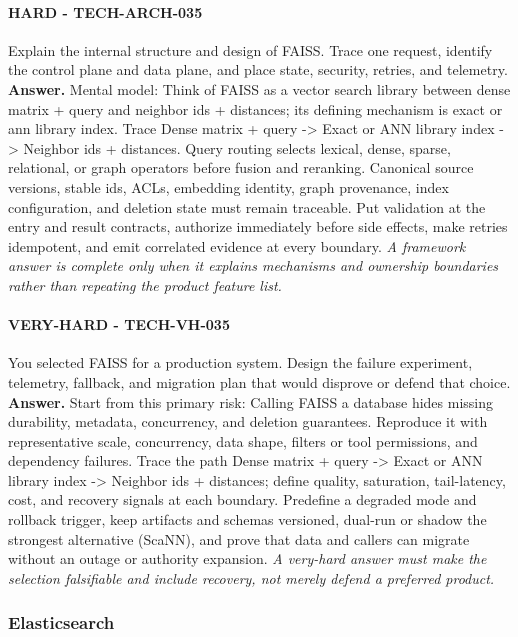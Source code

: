 \paragraph{HARD - TECH-ARCH-035} Explain the internal structure and design of FAISS. Trace one request, identify the control plane and data plane, and place state, security, retries, and telemetry.
\textbf{Answer.} Mental model: Think of FAISS as a vector search library between dense matrix + query and neighbor ids + distances; its defining mechanism is exact or ann library index. Trace Dense matrix + query -> Exact or ANN library index -> Neighbor ids + distances. Query routing selects lexical, dense, sparse, relational, or graph operators before fusion and reranking. Canonical source versions, stable ids, ACLs, embedding identity, graph provenance, index configuration, and deletion state must remain traceable. Put validation at the entry and result contracts, authorize immediately before side effects, make retries idempotent, and emit correlated evidence at every boundary.
\textit{A framework answer is complete only when it explains mechanisms and ownership boundaries rather than repeating the product feature list.}
\paragraph{VERY-HARD - TECH-VH-035} You selected FAISS for a production system. Design the failure experiment, telemetry, fallback, and migration plan that would disprove or defend that choice.
\textbf{Answer.} Start from this primary risk: Calling FAISS a database hides missing durability, metadata, concurrency, and deletion guarantees. Reproduce it with representative scale, concurrency, data shape, filters or tool permissions, and dependency failures. Trace the path Dense matrix + query -> Exact or ANN library index -> Neighbor ids + distances; define quality, saturation, tail-latency, cost, and recovery signals at each boundary. Predefine a degraded mode and rollback trigger, keep artifacts and schemas versioned, dual-run or shadow the strongest alternative (ScaNN), and prove that data and callers can migrate without an outage or authority expansion.
\textit{A very-hard answer must make the selection falsifiable and include recovery, not merely defend a preferred product.}
\subsubsection*{Elasticsearch}
